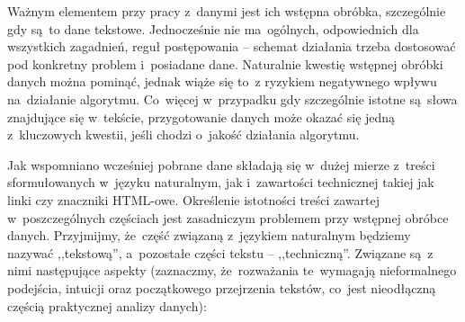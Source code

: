 \documentclass{praca1}
\begin{document}
Ważnym elementem przy pracy z~danymi jest ich wstępna obróbka, szczególnie gdy są~to dane tekstowe. Jednocześnie nie ma~ogólnych, odpowiednich dla wszystkich zagadnień, reguł postępowania -- schemat działania trzeba dostosować pod konkretny problem i~posiadane dane. Naturalnie kwestię wstępnej obróbki danych można pominąć, jednak wiąże się to~z ryzykiem negatywnego wpływu na~działanie algorytmu. Co~więcej w~przypadku gdy szczególnie istotne są~słowa znajdujące się w~tekście, przygotowanie danych może okazać się jedną z~kluczowych kwestii, jeśli chodzi o~jakość działania algorytmu.

Jak wspomniano wcześniej pobrane dane składają się w~dużej mierze z~treści sformułowanych w~języku naturalnym, jak i~zawartości technicznej takiej jak linki czy znaczniki HTML-owe. Określenie istotności treści zawartej w~poszczególnych częściach jest zasadniczym problemem przy wstępnej obróbce danych. Przyjmijmy, że~część związaną z~językiem naturalnym będziemy nazywać ,,tekstową'', a~pozostałe części tekstu -- ,,techniczną''. Związane są~z nimi następujące aspekty (zaznaczmy, że~rozważania te~wymagają nieformalnego podejścia, intuicji oraz początkowego przejrzenia tekstów, co~jest nieodłączną częścią praktycznej analizy danych):
\end{document}
